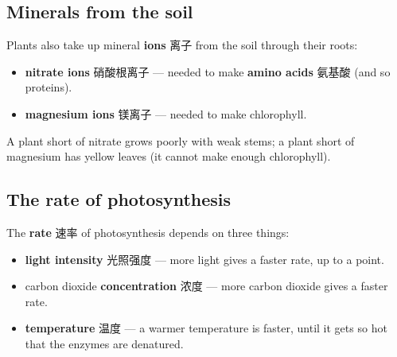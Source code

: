 \documentclass[11pt]{article}
\begin{document}
\begin{center}
\end{center}

\subsection*{Minerals from the soil}

Plants also take up mineral \textbf{ions} 离子 from the soil through their roots:

\begin{itemize}
\item \textbf{nitrate ions} 硝酸根离子 — needed to make \textbf{amino acids} 氨基酸 (and so proteins).

\item \textbf{magnesium ions} 镁离子 — needed to make chlorophyll.

\end{itemize}

A plant short of nitrate grows poorly with weak stems; a plant short of magnesium has yellow leaves (it cannot make enough chlorophyll).

\subsection*{The rate of photosynthesis}

The \textbf{rate} 速率 of photosynthesis depends on three things:

\begin{itemize}
\item \textbf{light intensity} 光照强度 — more light gives a faster rate, up to a point.

\item carbon dioxide \textbf{concentration} 浓度 — more carbon dioxide gives a faster rate.

\item \textbf{temperature} 温度 — a warmer temperature is faster, until it gets so hot that the enzymes are denatured.

\end{itemize}
\end{document}
